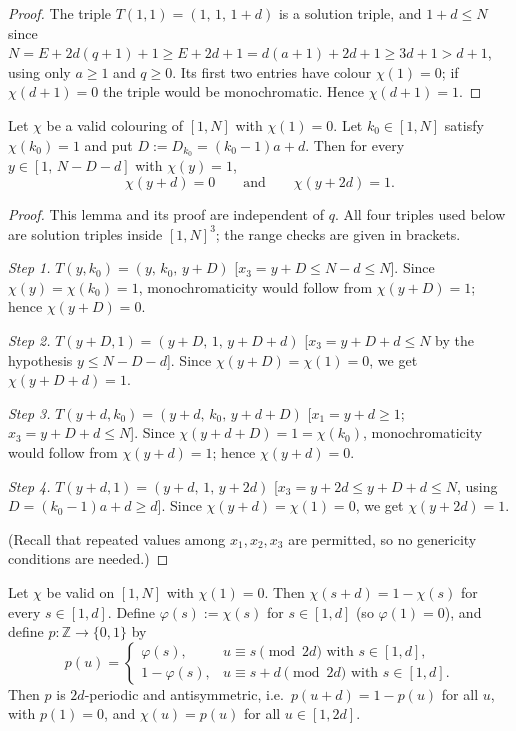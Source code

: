 \begin{proof}
The triple $T(1,1) = (1,\, 1,\, 1+d)$ is a solution triple, and
$1 + d \le N$ since
$N = E + 2d(q+1) + 1 \ge E + 2d + 1 = d(a+1) + 2d + 1 \ge 3d + 1 > d + 1$,
using only $a \ge 1$ and $q \ge 0$. Its first two entries have colour
$\chi(1) = 0$; if $\chi(d+1) = 0$ the triple would be monochromatic. Hence
$\chi(d+1) = 1$.
\end{proof}

\begin{lemma}[transport]\label{lem:ub1-transport}
Let $\chi$ be a valid colouring of $[1,N]$ with $\chi(1) = 0$. Let
$k_0 \in [1,N]$ satisfy $\chi(k_0) = 1$ and put
$D := D_{k_0} = (k_0 - 1)a + d$. Then for every $y \in [1,\, N - D - d]$
with $\chi(y) = 1$,
\[
\chi(y + d) = 0 \qquad\text{and}\qquad \chi(y + 2d) = 1 .
\]
\end{lemma}

\begin{proof}
This lemma and its proof are independent of $q$. All four triples used
below are solution triples inside $[1,N]^3$; the range checks are given in
brackets.

\emph{Step 1.} $T(y, k_0) = (y,\, k_0,\, y + D)$
[$x_3 = y + D \le N - d \le N$]. Since $\chi(y) = \chi(k_0) = 1$,
monochromaticity would follow from $\chi(y + D) = 1$; hence
$\chi(y + D) = 0$.

\emph{Step 2.} $T(y + D, 1) = (y + D,\, 1,\, y + D + d)$
[$x_3 = y + D + d \le N$ by the hypothesis $y \le N - D - d$]. Since
$\chi(y + D) = \chi(1) = 0$, we get $\chi(y + D + d) = 1$.

\emph{Step 3.} $T(y + d, k_0) = (y + d,\, k_0,\, y + d + D)$
[$x_1 = y + d \ge 1$; $x_3 = y + D + d \le N$]. Since
$\chi(y + d + D) = 1 = \chi(k_0)$, monochromaticity would follow from
$\chi(y + d) = 1$; hence $\chi(y + d) = 0$.

\emph{Step 4.} $T(y + d, 1) = (y + d,\, 1,\, y + 2d)$
[$x_3 = y + 2d \le y + D + d \le N$, using $D = (k_0 - 1)a + d \ge d$].
Since $\chi(y + d) = \chi(1) = 0$, we get $\chi(y + 2d) = 1$.

(Recall that repeated values among $x_1, x_2, x_3$ are permitted, so no
genericity conditions are needed.)
\end{proof}

\begin{lemma}[pairing]\label{lem:ub1-pairing}
Let $\chi$ be valid on $[1,N]$ with $\chi(1) = 0$. Then
$\chi(s + d) = 1 - \chi(s)$ for every $s \in [1,d]$. Define
$\varphi(s) := \chi(s)$ for $s \in [1,d]$ (so $\varphi(1) = 0$), and define
$p\colon \mathbb{Z} \to \{0,1\}$ by
\[
p(u) =
\begin{cases}
\varphi(s), & u \equiv s \pmod{2d} \text{ with } s \in [1,d],\\
1 - \varphi(s), & u \equiv s + d \pmod{2d} \text{ with } s \in [1,d].
\end{cases}
\]
Then $p$ is $2d$-periodic and antisymmetric, i.e.\ $p(u + d) = 1 - p(u)$
for all $u$, with $p(1) = 0$, and $\chi(u) = p(u)$ for all $u \in [1, 2d]$.
\end{lemma}


